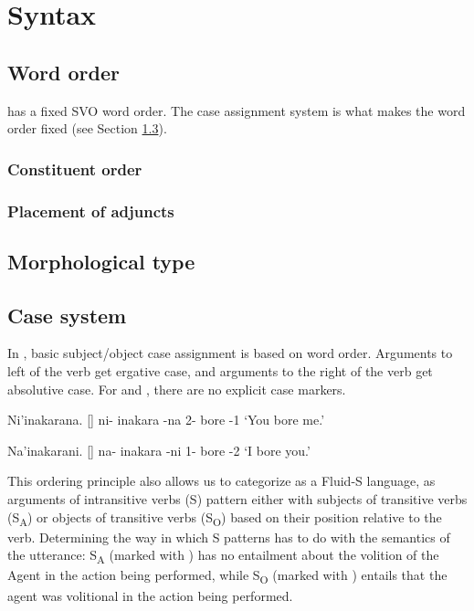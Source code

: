 \chapter{Syntax}
	
	\section{Word order} 
		{\kurango} has a fixed SVO word order. The case assignment system is what makes the word order fixed (see Section \ref{case}).
		\subsection{Constituent order} %
		\subsection{Placement of adjuncts}
	\section{Morphological type} %

	\section{Case system} %
	\label{case}
		In \kurango , basic subject/object case assignment is based on word order. Arguments to left of the verb get ergative case, and arguments to the right of the verb get absolutive case. For {} and {}, there are no explicit case markers.



		\begin{example}
		\label{ex:case_wordorder_1}
			Ni'inakarana. []
			\gll ni- inakara -na
			2- bore -1
			\glt `You bore me.'
			\glend
		\end{example}

		\begin{example}
		\label{ex:case_wordorder_2}
			Na'inakarani. [\textipa{naPinakaRani}]
			\gll na- inakara -ni
			1- bore -2
			\glt `I bore you.'
			\glend
		\end{example}

		This ordering principle also allows us to categorize {\kurango} as a Fluid-S language, as arguments of intransitive verbs (S) pattern either with subjects of transitive verbs (S\textsubscript{A}) or objects of transitive verbs (S\textsubscript{O}) based on their position relative to the verb. Determining the way in which S patterns has to do with the semantics of the utterance: S\textsubscript{A} (marked with {}) has no entailment about the volition of the Agent in the action being performed, while S\textsubscript{O} (marked with {}) entails that the agent was volitional in the action being performed.


